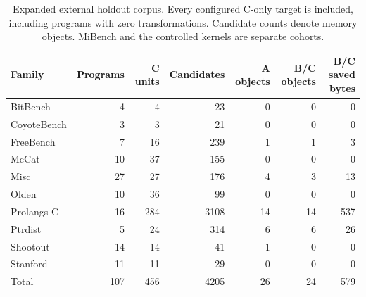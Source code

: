 \begin{table}[t]
\centering
\caption{Expanded external holdout corpus. Every configured C-only target is
included, including programs with zero transformations. Candidate counts denote
memory objects. MiBench and the controlled kernels are separate cohorts.}
\label{tab:expanded-corpus}
\small
\begin{tabular}{@{}lrrrrrr@{}}
\toprule
Family & Programs & C units & Candidates & A objects & B/C objects & B/C saved bytes \\
\midrule
BitBench & 4 & 4 & 23 & 0 & 0 & 0 \\
CoyoteBench & 3 & 3 & 21 & 0 & 0 & 0 \\
FreeBench & 7 & 16 & 239 & 1 & 1 & 3 \\
McCat & 10 & 37 & 155 & 0 & 0 & 0 \\
Misc & 27 & 27 & 176 & 4 & 3 & 13 \\
Olden & 10 & 36 & 99 & 0 & 0 & 0 \\
Prolangs-C & 16 & 284 & 3108 & 14 & 14 & 537 \\
Ptrdist & 5 & 24 & 314 & 6 & 6 & 26 \\
Shootout & 14 & 14 & 41 & 1 & 0 & 0 \\
Stanford & 11 & 11 & 29 & 0 & 0 & 0 \\
\midrule
Total & 107 & 456 & 4205 & 26 & 24 & 579 \\
\bottomrule
\end{tabular}
\end{table}
